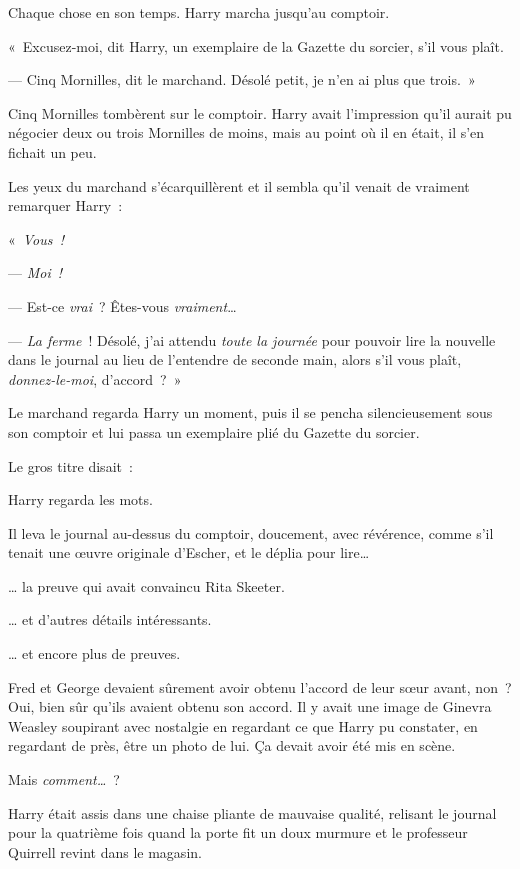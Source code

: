 Chaque chose en son temps. Harry marcha jusqu'au comptoir.

«~Excusez-moi, dit Harry, un exemplaire de la Gazette du sorcier, s'il vous plaît.

--- Cinq Mornilles, dit le marchand. Désolé petit, je n'en ai plus que trois.~»

Cinq Mornilles tombèrent sur le comptoir. Harry avait l'impression qu'il aurait pu négocier deux ou trois Mornilles de moins, mais au point où il en était, il s'en fichait un peu.

Les yeux du marchand s'écarquillèrent et il sembla qu'il venait de vraiment remarquer Harry~:

«~\emph{Vous~!}

--- \emph{Moi~!}

--- Est-ce \emph{vrai}~? Êtes-vous \emph{vraiment}…

--- \emph{La ferme}~! Désolé, j'ai attendu \emph{toute la journée} pour pouvoir lire la nouvelle dans le journal au lieu de l'entendre de seconde main, alors s'il vous plaît, \emph{donnez-le-moi}, d'accord~?~»

Le marchand regarda Harry un moment, puis il se pencha silencieusement sous son comptoir et lui passa un exemplaire plié du Gazette du sorcier.

Le gros titre disait~:

Harry regarda les mots.

Il leva le journal au-dessus du comptoir, doucement, avec révérence, comme s'il tenait une œuvre originale d'Escher, et le déplia pour lire…

… la preuve qui avait convaincu Rita Skeeter.

… et d'autres détails intéressants.

… et encore plus de preuves.

Fred et George devaient sûrement avoir obtenu l'accord de leur sœur avant, non~? Oui, bien sûr qu'ils avaient obtenu son accord. Il y avait une image de Ginevra Weasley soupirant avec nostalgie en regardant ce que Harry pu constater, en regardant de près, être un photo de lui. Ça devait avoir été mis en scène.

Mais \emph{comment…}~?

Harry était assis dans une chaise pliante de mauvaise qualité, relisant le journal pour la quatrième fois quand la porte fit un doux murmure et le professeur Quirrell revint dans le magasin.

